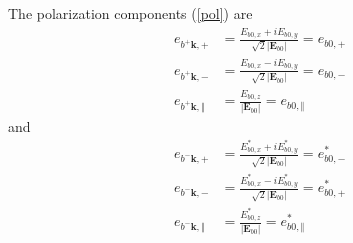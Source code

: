 The polarization components (\ref{pol}) are%
\begin{align}
e_{b^{+}\mathbf{k},+}  &  =\frac{E_{b0,x}+iE_{b0,y}}{\sqrt{2}\left|
\mathbf{E}_{b0}\right|  }=e_{b0,+}\\
e_{b^{+}\mathbf{k},-}  &  =\frac{E_{b0,x}-iE_{b0,y}}{\sqrt{2}\left|
\mathbf{E}_{b0}\right|  }=e_{b0,-}\nonumber\\
e_{b^{+}\mathbf{k},\Vert}  &  =\frac{E_{b0,z}}{\left|  \mathbf{E}_{b0}\right|
}=e_{b0,\Vert}\nonumber
\end{align}
and
\begin{align}
e_{b^{-}\mathbf{k},+}  &  =\frac{E_{b0,x}^{\ast}+iE_{b0,y}^{\ast}}{\sqrt
{2}\left|  \mathbf{E}_{b0}\right|  }=e_{b0,-}^{\ast}\\
e_{b^{-}\mathbf{k},-}  &  =\frac{E_{b0,x}^{\ast}-iE_{b0,y}^{\ast}}{\sqrt
{2}\left|  \mathbf{E}_{b0}\right|  }=e_{b0,+}^{\ast}\nonumber\\
e_{b^{-}\mathbf{k},\Vert}  &  =\frac{E_{b0,z}^{\ast}}{\left|  \mathbf{E}%
_{b0}\right|  }=e_{b0,\Vert}^{\ast}\nonumber
\end{align}

